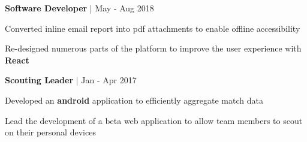 \begin{cventries}

\cventry
{\textbf{Software Developer} | \color{awesome}{TemboSocial}}
{May - Aug 2018} %
{ %
\begin{cvitems}
\item {Converted inline email report into pdf attachments to enable offline accessibility}
\item {Re-designed numerous parts of the platform to improve the user experience with \textbf{React}}
\end{cvitems}
}


\cventry
{\textbf{Scouting Leader} | \color{awesome}{FRC Team 610}}
{Jan - Apr 2017} %
{ %
\begin{cvitems}
\item {Developed an \textbf{android} application to efficiently aggregate match data}
\item {Lead the development of a beta web application to allow team members to scout on their personal devices}
\end{cvitems}
}


\end{cventries}
